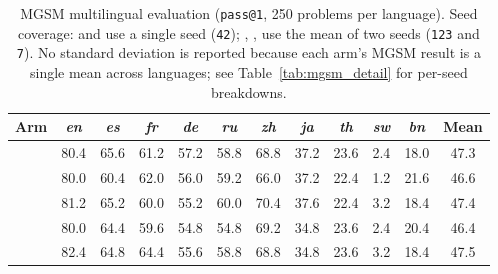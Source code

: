 \begin{table}[t]
\centering\small
\caption{MGSM multilingual evaluation (\texttt{pass@1}, 250 problems per
language).
Seed coverage: \base{} and \armD{} use a single seed (\texttt{42});
\armA{}, \armB{}, \armC{} use the mean of two seeds
(\texttt{123} and \texttt{7}).
No standard deviation is reported because each arm's MGSM result is a
single mean across languages; see Table~\ref{tab:mgsm_detail}
for per-seed breakdowns.}
\label{tab:mgsm}
\begin{tabular}{lccccccccccc}
\toprule
Arm & \textit{en} & \textit{es} & \textit{fr} & \textit{de} & \textit{ru} & \textit{zh} & \textit{ja} & \textit{th} & \textit{sw} & \textit{bn} & Mean \\
\midrule
\base{} & 80.4 & 65.6 & 61.2 & 57.2 & 58.8 & 68.8 & 37.2 & 23.6 & 2.4 & 18.0 & 47.3 \\
\armA{} & 80.0 & 60.4 & 62.0 & 56.0 & 59.2 & 66.0 & 37.2 & 22.4 & 1.2 & 21.6 & 46.6 \\
\armB{} & 81.2 & 65.2 & 60.0 & 55.2 & 60.0 & 70.4 & 37.6 & 22.4 & 3.2 & 18.4 & 47.4 \\
\armC{} & 80.0 & 64.4 & 59.6 & 54.8 & 54.8 & 69.2 & 34.8 & 23.6 & 2.4 & 20.4 & 46.4 \\
\armD{} & 82.4 & 64.8 & 64.4 & 55.6 & 58.8 & 68.8 & 34.8 & 23.6 & 3.2 & 18.4 & 47.5 \\
\bottomrule
\end{tabular}
\end{table}
